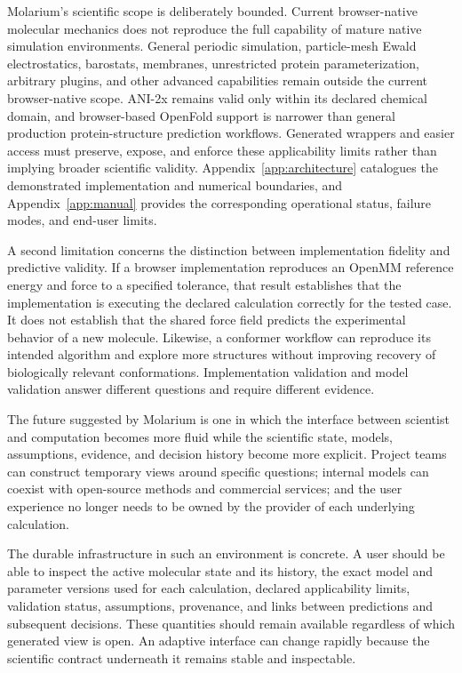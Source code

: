\documentclass[11pt]{article}
\begin{document}
Molarium's scientific scope is deliberately bounded. Current browser-native molecular mechanics does not reproduce the full capability of mature native simulation environments. General periodic simulation, particle-mesh Ewald electrostatics, barostats, membranes, unrestricted protein parameterization, arbitrary plugins, and other advanced capabilities remain outside the current browser-native scope. ANI-2x remains valid only within its declared chemical domain, and browser-based OpenFold support is narrower than general production protein-structure prediction workflows. Generated wrappers and easier access must preserve, expose, and enforce these applicability limits rather than implying broader scientific validity. Appendix~\ref{app:architecture} catalogues the demonstrated implementation and numerical boundaries, and Appendix~\ref{app:manual} provides the corresponding operational status, failure modes, and end-user limits.

A second limitation concerns the distinction between implementation fidelity and predictive validity. If a browser implementation reproduces an OpenMM reference energy and force to a specified tolerance, that result establishes that the implementation is executing the declared calculation correctly for the tested case. It does not establish that the shared force field predicts the experimental behavior of a new molecule. Likewise, a conformer workflow can reproduce its intended algorithm and explore more structures without improving recovery of biologically relevant conformations. Implementation validation and model validation answer different questions and require different evidence.

The future suggested by Molarium is one in which the interface between scientist and computation becomes more fluid while the scientific state, models, assumptions, evidence, and decision history become more explicit. Project teams can construct temporary views around specific questions; internal models can coexist with open-source methods and commercial services; and the user experience no longer needs to be owned by the provider of each underlying calculation.

The durable infrastructure in such an environment is concrete. A user should be able to inspect the active molecular state and its history, the exact model and parameter versions used for each calculation, declared applicability limits, validation status, assumptions, provenance, and links between predictions and subsequent decisions. These quantities should remain available regardless of which generated view is open. An adaptive interface can change rapidly because the scientific contract underneath it remains stable and inspectable.
\end{document}
